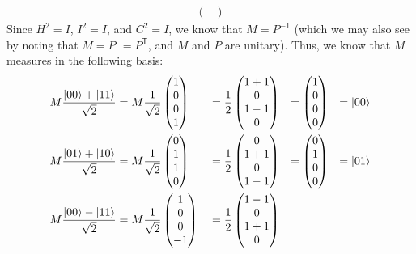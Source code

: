 \documentclass[12pt]{amsart}
\begin{document}
{\begin{enumerate}
\begin{align*}
\begin{pmatrix}
         \end{pmatrix}
    \end{align*}
    Since $H^2 = I$, $I^2 = I$, and $C^2 = I$, we know that $M = P^{-1}$ (which
    we may also see by noting that $M = P^\dag = P^{\mathsf{T}}$, and $M$ and
    $P$ are unitary).  Thus, we know that $M$ measures in the following basis:
    \begin{alignat*}{4}
      M\frac{\ket{00} + \ket{11}}{\sqrt{2}}
        &= M\frac{1}{\sqrt{2}}\begin{pmatrix} 1 \\ 0 \\ 0 \\ 1 \end{pmatrix}
       &&= \frac{1}{2}\begin{pmatrix} 1+1 \\ 0 \\ 1-1 \\ 0 \end{pmatrix}
        &= \begin{pmatrix} 1 \\ 0 \\ 0 \\ 0 \end{pmatrix}
       &&= \ket{00} \\
      M\frac{\ket{01} + \ket{10}}{\sqrt{2}}
        &= M\frac{1}{\sqrt{2}}\begin{pmatrix} 0 \\ 1 \\ 1 \\ 0 \end{pmatrix}
       &&= \frac{1}{2}\begin{pmatrix} 0 \\ 1+1 \\ 0 \\ 1-1 \end{pmatrix}
        &= \begin{pmatrix} 0 \\ 1 \\ 0 \\ 0 \end{pmatrix}
       &&= \ket{01} \\
      M\frac{\ket{00} - \ket{11}}{\sqrt{2}}
        &= M\frac{1}{\sqrt{2}}\begin{pmatrix} 1 \\ 0 \\ 0 \\ -1 \end{pmatrix}
       &&= \frac{1}{2}\begin{pmatrix} 1-1 \\ 0 \\ 1+1 \\ 0 \end{pmatrix}

\end{alignat*}
\end{enumerate}}
\end{document}

